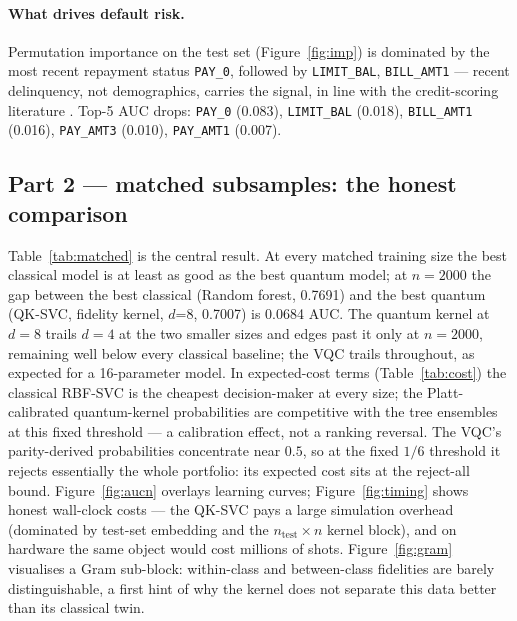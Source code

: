 \documentclass[11pt]{article}
\begin{document}
\paragraph{What drives default risk.} Permutation importance on the test set
(Figure~\ref{fig:imp}) is dominated by the most recent repayment status
\texttt{PAY\_0}, followed by \texttt{LIMIT\_BAL}, \texttt{BILL\_AMT1} --- recent delinquency, not
demographics, carries the signal, in line with the credit-scoring literature
\cite{yeh2009,lessmann2015}. Top-5 AUC drops: \texttt{PAY\_0} (0.083), \texttt{LIMIT\_BAL} (0.018), \texttt{BILL\_AMT1} (0.016), \texttt{PAY\_AMT3} (0.010), \texttt{PAY\_AMT1} (0.007).

\subsection{Part 2 --- matched subsamples: the honest comparison}
Table~\ref{tab:matched} is the central result. At every matched training size
the best classical model is at least as good as the best quantum model; at
$n = 2000$ the gap between the best classical (Random forest,
0.7691) and the best quantum (QK-SVC, fidelity kernel, $d$=8, 0.7007) is
0.0684 AUC. The quantum kernel at $d=8$ trails $d=4$ at the two smaller
sizes and edges past it only at $n=2000$, remaining well below every
classical baseline; the VQC trails throughout, as expected for a
16-parameter model. In expected-cost terms (Table~\ref{tab:cost})
the classical RBF-SVC is the cheapest decision-maker at every size; the
Platt-calibrated quantum-kernel probabilities are competitive with the tree
ensembles at this fixed threshold --- a calibration effect, not a ranking
reversal. The VQC's parity-derived probabilities concentrate near $0.5$, so
at the fixed $1/6$ threshold it rejects essentially the whole portfolio: its
expected cost sits at the reject-all bound. Figure~\ref{fig:aucn} overlays learning
curves; Figure~\ref{fig:timing} shows honest wall-clock costs --- the QK-SVC
pays a large simulation overhead (dominated by test-set embedding and the
$n_{\text{test}} \times n$ kernel block), and on hardware the same object
would cost millions of shots. Figure~\ref{fig:gram} visualises a Gram
sub-block: within-class and between-class fidelities are barely
distinguishable, a first hint of why the kernel does not separate this data
better than its classical twin.
\end{document}
